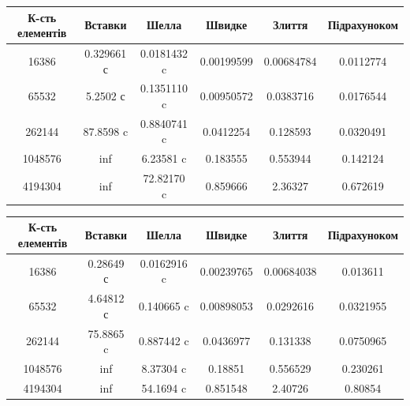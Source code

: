 \documentclass[12pt]{extarticle}
\begin{document}
\begin{center}
    \begin{tabular}{| c | c | c | c | c | c |}
    \hline
    К-сть елементів & Вставки & Шелла & Швидке & Злиття & Підрахуноком\\
    \hline
    16386 & 0.329661 с & 0.0181432 c & 0.00199599 & 0.00684784 &0.0112774\\
    \hline
    65532 & 5.2502 с & 0.1351110 c & 0.00950572 & 0.0383716&0.0176544\\
    \hline
    262144 & 87.8598 c & 0.8840741 c & 0.0412254 & 0.128593&0.0320491\\
    \hline
    1048576 & inf & 6.23581 c & 0.183555 & 0.553944&0.142124\\
    \hline
    4194304 & inf & 72.82170 c & 0.859666 &  2.36327&0.672619\\
    \hline
    \end{tabular}

\end{center}
\begin{center}
    \begin{tabular}{| c | c | c | c | c | c |}
    \hline
    К-сть елементів & Вставки & Шелла & Швидке & Злиття & Підрахуноком\\
    \hline
    16386 & 0.28649 с & 0.0162916 c & 0.00239765 & 0.00684038 &0.013611\\
    \hline
    65532 & 4.64812 с & 0.140665 c & 0.00898053 & 0.0292616&0.0321955\\
    \hline
    262144 & 75.8865 c & 0.887442 c & 0.0436977 & 0.131338&0.0750965\\
    \hline
    1048576 & inf & 8.37304 c &  0.18851 & 0.556529&0.230261\\
    \hline
    4194304 & inf & 54.1694 c &  0.851548 & 2.40726&0.80854\\
    \hline
    \end{tabular}
\end{center}
\end{document}

